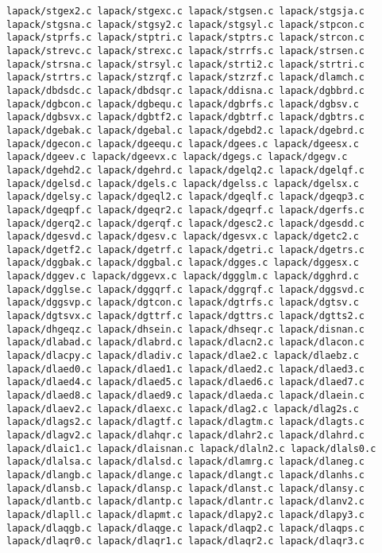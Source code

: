 \documentclass[10pt,a4paper]{article}
\begin{document}
\begin{codeparchment}
\begin{lstlisting}
lapack/stgex2.c lapack/stgexc.c lapack/stgsen.c lapack/stgsja.c 
lapack/stgsna.c lapack/stgsy2.c lapack/stgsyl.c lapack/stpcon.c 
lapack/stprfs.c lapack/stptri.c lapack/stptrs.c lapack/strcon.c 
lapack/strevc.c lapack/strexc.c lapack/strrfs.c lapack/strsen.c 
lapack/strsna.c lapack/strsyl.c lapack/strti2.c lapack/strtri.c 
lapack/strtrs.c lapack/stzrqf.c lapack/stzrzf.c lapack/dlamch.c 
lapack/dbdsdc.c lapack/dbdsqr.c lapack/ddisna.c lapack/dgbbrd.c 
lapack/dgbcon.c lapack/dgbequ.c lapack/dgbrfs.c lapack/dgbsv.c 
lapack/dgbsvx.c lapack/dgbtf2.c lapack/dgbtrf.c lapack/dgbtrs.c 
lapack/dgebak.c lapack/dgebal.c lapack/dgebd2.c lapack/dgebrd.c 
lapack/dgecon.c lapack/dgeequ.c lapack/dgees.c lapack/dgeesx.c 
lapack/dgeev.c lapack/dgeevx.c lapack/dgegs.c lapack/dgegv.c 
lapack/dgehd2.c lapack/dgehrd.c lapack/dgelq2.c lapack/dgelqf.c 
lapack/dgelsd.c lapack/dgels.c lapack/dgelss.c lapack/dgelsx.c 
lapack/dgelsy.c lapack/dgeql2.c lapack/dgeqlf.c lapack/dgeqp3.c 
lapack/dgeqpf.c lapack/dgeqr2.c lapack/dgeqrf.c lapack/dgerfs.c 
lapack/dgerq2.c lapack/dgerqf.c lapack/dgesc2.c lapack/dgesdd.c 
lapack/dgesvd.c lapack/dgesv.c lapack/dgesvx.c lapack/dgetc2.c 
lapack/dgetf2.c lapack/dgetrf.c lapack/dgetri.c lapack/dgetrs.c 
lapack/dggbak.c lapack/dggbal.c lapack/dgges.c lapack/dggesx.c 
lapack/dggev.c lapack/dggevx.c lapack/dggglm.c lapack/dgghrd.c 
lapack/dgglse.c lapack/dggqrf.c lapack/dggrqf.c lapack/dggsvd.c 
lapack/dggsvp.c lapack/dgtcon.c lapack/dgtrfs.c lapack/dgtsv.c 
lapack/dgtsvx.c lapack/dgttrf.c lapack/dgttrs.c lapack/dgtts2.c 
lapack/dhgeqz.c lapack/dhsein.c lapack/dhseqr.c lapack/disnan.c 
lapack/dlabad.c lapack/dlabrd.c lapack/dlacn2.c lapack/dlacon.c 
lapack/dlacpy.c lapack/dladiv.c lapack/dlae2.c lapack/dlaebz.c 
lapack/dlaed0.c lapack/dlaed1.c lapack/dlaed2.c lapack/dlaed3.c 
lapack/dlaed4.c lapack/dlaed5.c lapack/dlaed6.c lapack/dlaed7.c 
lapack/dlaed8.c lapack/dlaed9.c lapack/dlaeda.c lapack/dlaein.c 
lapack/dlaev2.c lapack/dlaexc.c lapack/dlag2.c lapack/dlag2s.c 
lapack/dlags2.c lapack/dlagtf.c lapack/dlagtm.c lapack/dlagts.c 
lapack/dlagv2.c lapack/dlahqr.c lapack/dlahr2.c lapack/dlahrd.c 
lapack/dlaic1.c lapack/dlaisnan.c lapack/dlaln2.c lapack/dlals0.c 
lapack/dlalsa.c lapack/dlalsd.c lapack/dlamrg.c lapack/dlaneg.c 
lapack/dlangb.c lapack/dlange.c lapack/dlangt.c lapack/dlanhs.c 
lapack/dlansb.c lapack/dlansp.c lapack/dlanst.c lapack/dlansy.c 
lapack/dlantb.c lapack/dlantp.c lapack/dlantr.c lapack/dlanv2.c 
lapack/dlapll.c lapack/dlapmt.c lapack/dlapy2.c lapack/dlapy3.c 
lapack/dlaqgb.c lapack/dlaqge.c lapack/dlaqp2.c lapack/dlaqps.c 
lapack/dlaqr0.c lapack/dlaqr1.c lapack/dlaqr2.c lapack/dlaqr3.c 

\end{lstlisting}
\end{codeparchment}
\end{document}
